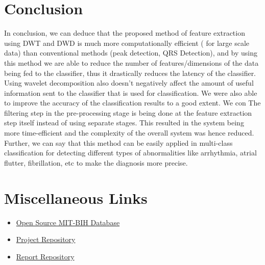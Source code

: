 \documentclass[10pt,twocolumn,letterpaper]{article}
\begin{document}
\section{Conclusion}
In conclusion, we can deduce that the proposed method of feature extraction using DWT and DWD is much more computationally efficient ( for large scale data) than conventional methods (peak detection, QRS Detection), and by using this method we are able to reduce the number of features/dimensions of the data being fed to the classifier, thus it drastically reduces the latency of the classifier.
Using wavelet decomposition also doesn’t negatively affect the amount of useful information sent to the classifier that is used for classification.
We were also able to improve the accuracy of the classification results to a good extent. We con
The filtering step in the pre-processing stage is being done at the feature extraction step itself instead of using separate stages. This resulted in the system being more time-efficient and the complexity of the overall system was hence reduced.
Further, we can say that this method can be easily applied in multi-class classification for detecting different types of abnormalities like arrhythmia, atrial flutter, fibrillation, etc to make the diagnosis more precise.


{\small


}


\section*{Miscellaneous Links}
\begin{itemize}
    \item \href{https://physionet.org/content/mitdb/1.0.0/}{Open Source MIT-BIH Database}
    \item \href{https://github.com/abhishekkhare1998/EcgClassificationProject}{Project Repository}
    \item \href{https://github.com/abhishekkhare1998/EcgClassWaveletPaper}{Report Repository}
\end{itemize}
\end{document}
